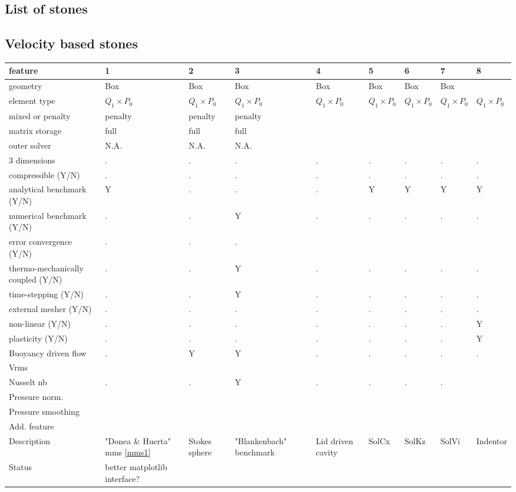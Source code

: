 



\begin{landscape}
\section{List of stones} %

\subsection{Velocity based stones}

{\tiny
\begin{tabular}{|l|p{2cm}|p{2cm}|p{2cm}|p{2cm}|p{2cm}|p{2cm}|p{2cm}|p{2cm}|} 
\hline
feature & 1 &2& 3& 4& 5& 6& 7& 8  \\
\hline
geometry & Box &Box&Box&Box&Box& Box&Box & \\
element type & $Q_1\times P_0$ &$Q_1\times P_0$ &$Q_1\times P_0$ &$Q_1\times P_0$ &$Q_1\times P_0$ &$Q_1\times P_0$ &$Q_1\times P_0$ &$Q_1\times P_0$   \\ 
mixed or penalty  & penalty& penalty& penalty&&&&& \\
matrix storage & full& full& full &&&&& \\
outer solver & N.A.  & N.A. & N.A.&&&&& \\
\hline
3 dimensions & . &.&.&.&.&.&.&. \\
compressible (Y/N) &.&.&.&.&.&.&.&. \\
analytical benchmark (Y/N) & Y &.&.&.&Y&Y&Y&Y \\
numerical benchmark (Y/N) & . &.& Y&.&.&.&.&. \\
error convergence (Y/N) &. &.&.&&&&& \\
thermo-mechanically coupled (Y/N) &.&.&Y&.&.&.&.&. \\
time-stepping (Y/N) &.&.&Y&.&.&.&.&. \\
external mesher (Y/N) &.&.&.&.&.&.&.&. \\
non-linear (Y/N) &.&.&.&.&.&.&.&Y \\
plasticity (Y/N) & . &.  &.&.&.&.&.&Y\\ 
Buoyancy driven flow & . & Y &Y &.&.&.&.&.\\
Vrms  &  &  & &&&&\\
Nusselt nb  & . & . &Y &.&.&.&.\\
Pressure norm. &&&& \\
Pressure smoothing &&&& \\
\hline
Add. feature &&&&&&&& \\
\hline
Description &
"Donea \& Huerta" mms \ref{mms1} &
Stokes sphere&
"Blankenbach" benchmark&
Lid driven cavity&
SolCx &
SolKz & 
SolVi & 
Indentor \\
\hline
Status & better matplotlib interface? &&&&&& \\
\end{tabular}
}


\end{landscape}
